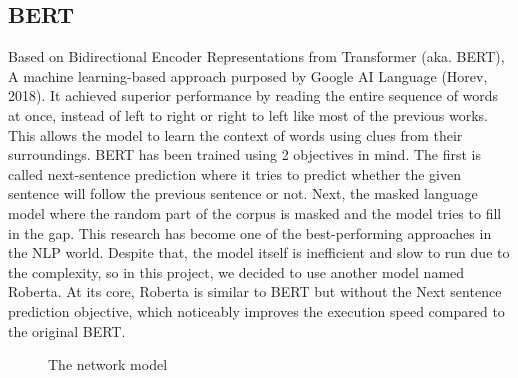 \documentclass[12pt,oneside,openright,a4paper]{cpe-english-project}
\begin{document}
\subsection{BERT}
Based on Bidirectional Encoder Representations from Transformer (aka. BERT), A machine learning-based approach purposed by Google AI Language (Horev, 2018). It achieved superior performance by reading the entire sequence of words at once, instead of left to right or right to left like most of the previous works. This allows the model to learn the context of words using clues from their surroundings. BERT has been trained using 2 objectives in mind. The first is called next-sentence prediction where it tries to predict whether the given sentence will follow the previous sentence or not. Next, the masked language model where the random part of the corpus is masked and the model tries to fill in the gap. This research has become one of the best-performing approaches in the NLP world. Despite that, the model itself is inefficient and slow to run due to the complexity, so in this project, we decided to use another model named Roberta. At its core, Roberta is similar to BERT but without the Next sentence prediction objective, which noticeably improves the execution speed compared to the original BERT.

\begin{figure}[!h]\centering
\setlength{\fboxrule}{0.2mm} %
\setlength{\fboxsep}{1cm}
\caption{The network model}\label{fig:model2}
\end{figure}
\end{document}
